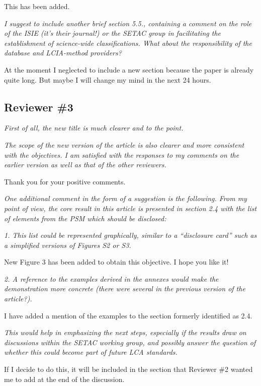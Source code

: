 \documentclass[11pt,letterpaper]{article}
\begin{document}
This has been added.

\emph{I suggest to include another brief section 5.5., containing a comment on the role of the ISIE (it’s their journal!) or the SETAC group in facilitating the establishment of science-wide classifications. What about the responsibility of the database and LCIA-method providers?}

At the moment I neglected to include a new section because the paper is already quite long.  But maybe I will change my mind in the next 24 hours.

\subsection*{Reviewer \#3}

\emph{First of all, the new title is much clearer and to the point.}

\emph{The scope of the new version of the article is also clearer and more consistent with the
objectives. I am satisfied with the responses to my comments on the earlier version as well as
that of the other reviewers.}

Thank you for your positive comments.

\emph{One additional comment in the form of a suggestion is the following. From my point of view, the
core result in this article is presented in section 2.4 with the list of elements from the PSM which
should be disclosed:}

\emph{1. This list could be represented graphically, similar to a “disclosure card” such as a
  simplified versions of Figures S2 or S3.}

New Figure 3 has been added to obtain this objective.  I hope you like it!

\emph{2. A reference to the examples derived in the annexes would make the demonstration
  more concrete (there were several in the previous version of the article?).}

I have added a mention of the examples to the section formerly identified as 2.4.

\emph{This would help in emphasizing the next steps, especially if the results draw on discussions
within the SETAC working group, and possibly answer the question of whether this could
become part of future LCA standards.}

If I decide to do this, it will be included in the section that Reviewer \#2 wanted me to add at the end of the discussion.
\end{document}

